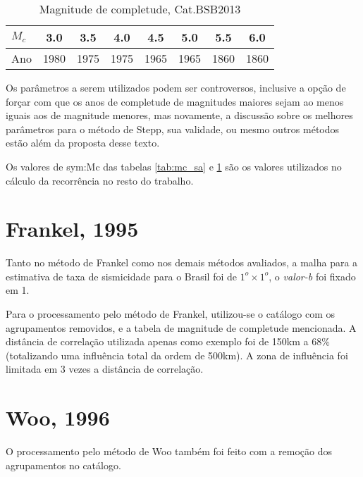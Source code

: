 	\begin{table}[h]
	  	\centering
		\begin{tabular}{l|*{7}{c}}
		$M_c$ & 3.0  & 3.5  & 4.0  & 4.5  & 5.0  & 5.5  & 6.0  \\  \hline
		Ano   & 1980 & 1975 & 1975 & 1965 & 1965 & 1860 & 1860 \\
		\end{tabular}
		\caption{Magnitude de completude, Cat.BSB2013}
		\label{tab:mc_br}
	\end{table}

Os parâmetros a serem utilizados podem ser controversos, inclusive a opção de forçar com que 
os anos de completude de magnitudes maiores sejam ao menos iguais aos de magnitude menores, 
mas novamente, a discussão sobre os melhores parâmetros para o método de Stepp, sua validade, ou 
mesmo outros métodos estão além da proposta desse texto.

Os valores de \gls{sym:Mc} das tabelas \ref{tab:mc_sa} e \ref{tab:mc_br} são os valores utilizados
no cálculo da recorrência no resto do trabalho.


\section{Frankel, 1995}
\label{sec:proc_frankel}

Tanto no método de Frankel como nos demais métodos avaliados,
a malha para a estimativa de taxa de sismicidade para o Brasil 
foi de $1^o \times 1^o$, o \emph{valor-b} foi fixado em 1.

Para o processamento pelo método de Frankel, utilizou-se o catálogo com os agrupamentos removidos,
e a tabela de magnitude de completude mencionada. A distância de correlação utilizada apenas como exemplo
foi de 150km a 68\% (totalizando uma influência total da ordem de 500km). A zona de influência foi limitada em 3 vezes a
distância de correlação.

\section{Woo, 1996}
\label{sec:proc_woo}

O processamento pelo método de Woo também foi feito com a remoção dos agrupamentos no catálogo.

